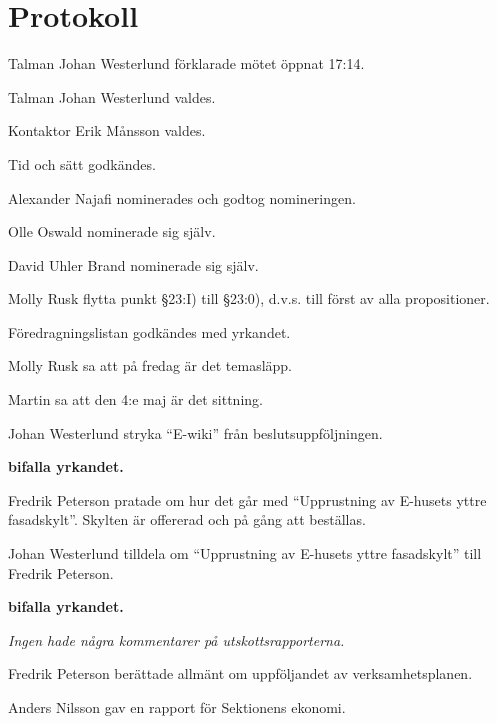 \documentclass[10pt]{article}
\def\mo{Johan Westerlund}
\def\ms{Erik Månsson}
\begin{document}
\newpage

\section*{Protokoll}
\begin{paragrafer}
Talman {\mo} förklarade mötet öppnat 17:14.

Talman {\mo} valdes.

Kontaktor {\ms} valdes.

Tid och sätt godkändes.

Alexander Najafi nominerades och godtog nomineringen.

Olle Oswald nominerade sig själv.

David Uhler Brand nominerade sig själv.

\valavj

\ingaadj

Molly Rusk \ypa flytta punkt \S23:I) till \S23:0), d.v.s. till först av alla propositioner.

Föredragningslistan godkändes med yrkandet.


Molly Rusk sa att på fredag är det temasläpp.

Martin sa att den 4:e maj är det sittning.


Johan Westerlund \ypa stryka ``E-wiki'' från beslutsuppföljningen.

\textbf{\Mba bifalla yrkandet.}

Fredrik Peterson pratade om hur det går med ``Upprustning av E-husets yttre fasadskylt''. Skylten är offererad och på gång att beställas.

Johan Westerlund \ypa tilldela om ``Upprustning av E-husets yttre fasadskylt'' till Fredrik Peterson. %

\textbf{\Mba bifalla yrkandet.}

\emph{Ingen hade några kommentarer på utskottsrapporterna.}

Fredrik Peterson berättade allmänt om uppföljandet av verksamhetsplanen.

Anders Nilsson gav en rapport för Sektionens ekonomi.


\end{paragrafer}
\end{document}
